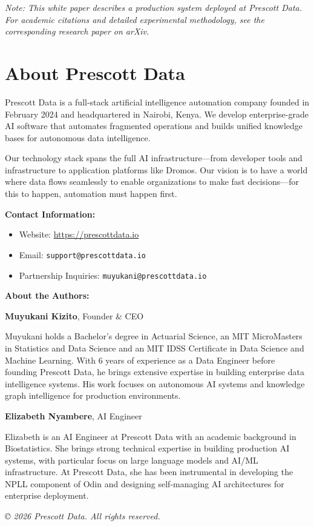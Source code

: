 \documentclass[11pt]{article}
\begin{document}
\vspace{0.5cm}

\noindent\textit{Note: This white paper describes a production system deployed at Prescott Data. For academic citations and detailed experimental methodology, see the corresponding research paper on arXiv.}

\vfill
\pagebreak

\section*{About Prescott Data}

Prescott Data is a full-stack artificial intelligence automation company founded in February 2024 and headquartered in Nairobi, Kenya. We develop enterprise-grade AI software that automates fragmented operations and builds unified knowledge bases for autonomous data intelligence. 

Our technology stack spans the full AI infrastructure—from developer tools and infrastructure to application platforms like Dromos. Our vision is to have a world where data flows seamlessly to enable organizations to make fast decisions—for this to happen, automation must happen first.

\textbf{Contact Information:}

\begin{itemize}
\item Website: \url{https://prescottdata.io}
\item Email: \texttt{support@prescottdata.io}
\item Partnership Inquiries: \texttt{muyukani@prescottdata.io}
\end{itemize}

\textbf{About the Authors:}

\textbf{Muyukani Kizito}, Founder \& CEO

Muyukani holds a Bachelor's degree in Actuarial Science, an MIT MicroMasters in Statistics and Data Science and an MIT IDSS Certificate in Data Science and Machine Learning. With 6 years of experience as a Data Engineer before founding Prescott Data, he brings extensive expertise in building enterprise data intelligence systems. His work focuses on autonomous AI systems and knowledge graph intelligence for production environments.

\textbf{Elizabeth Nyambere}, AI Engineer

Elizabeth is an AI Engineer at Prescott Data with an academic background in Biostatistics. She brings strong technical expertise in building production AI systems, with particular focus on large language models and AI/ML infrastructure. At Prescott Data, she has been instrumental in developing the NPLL component of Odin and designing self-managing AI architectures for enterprise deployment.


\vspace{1cm}
\begin{center}
\textit{© 2026 Prescott Data. All rights reserved.}
\end{center}
\end{document}
